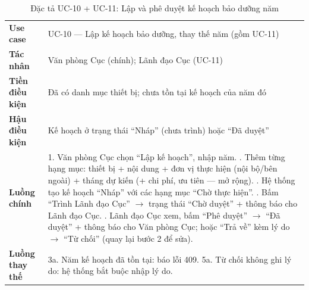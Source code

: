 \begin{table}[h]
\centering
\caption{Đặc tả UC-10 + UC-11: Lập và phê duyệt kế hoạch bảo dưỡng năm}
\label{tab:uc10}
\begin{tabular}{P{3.2cm}P{11.8cm}}
\toprule
\textbf{Use case} & UC-10 — Lập kế hoạch bảo dưỡng, thay thế năm (gồm UC-11) \\
\textbf{Tác nhân} & Văn phòng Cục (chính); Lãnh đạo Cục (UC-11) \\
\textbf{Tiền điều kiện} & Đã có danh mục thiết bị; chưa tồn tại kế hoạch của năm đó \\
\textbf{Hậu điều kiện} & Kế hoạch ở trạng thái ``Nháp'' (chưa trình) hoặc ``Đã duyệt'' \\
\midrule
\textbf{Luồng chính} & 1. Văn phòng Cục chọn ``Lập kế hoạch'', nhập năm. . Thêm từng hạng mục: thiết bị + nội dung + đơn vị thực hiện (nội bộ/bên ngoài) + tháng dự kiến (+ chi phí, ưu tiên — mở rộng). . Hệ thống tạo kế hoạch ``Nháp'' với các hạng mục ``Chờ thực hiện''. . Bấm ``Trình Lãnh đạo Cục'' $\rightarrow$ trạng thái ``Chờ duyệt'' + thông báo cho Lãnh đạo Cục. . Lãnh đạo Cục xem, bấm ``Phê duyệt'' $\rightarrow$ ``Đã duyệt'' + thông báo cho Văn phòng Cục; hoặc ``Trả về'' kèm lý do $\rightarrow$ ``Từ chối'' (quay lại bước 2 để sửa). \\
\textbf{Luồng thay thế} & 3a. Năm kế hoạch đã tồn tại: báo lỗi 409. \newline 5a. Từ chối không ghi lý do: hệ thống bắt buộc nhập lý do. \\
\bottomrule
\end{tabular}
\end{table}


